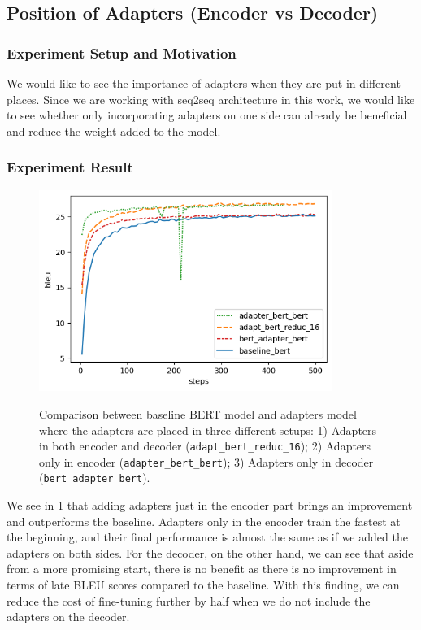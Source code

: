 \subsection{Position of Adapters (Encoder vs Decoder)}
\label{sec:posada}
\subsubsection{Experiment Setup and Motivation}
We would like to see the importance of adapters when they are put in different places. Since we are working with seq2seq architecture in this work, we would like to see whether only incorporating adapters on one side can already be beneficial and reduce the weight added to the model.

\subsubsection{Experiment Result}
\begin{figure}[]
    {\includegraphics[width=0.85\textwidth]{img/bert_pos.png}}
    \centering
    \caption[Results of ablation study for adapters in the encoder or the decoder.]{Comparison between baseline BERT model and adapters model where the adapters are placed in three different setups: 1) Adapters in both encoder and decoder (\texttt{adapt\_bert\_reduc\_16}); 2) Adapters only in encoder (\texttt{adapter\_bert\_bert}); 3) Adapters only in decoder (\texttt{bert\_adapter\_bert}).}
    \label{img:adapt_bert_pos}
\end{figure}
We see in \cref{img:adapt_bert_pos} that adding adapters just in the encoder part brings an improvement and outperforms the baseline. Adapters only in the encoder train the fastest at the beginning, and their final performance is almost the same as if we added the adapters on both sides. For the decoder, on the other hand, we can see that aside from a more promising start, there is no benefit as there is no improvement in terms of late BLEU scores compared to the baseline. With this finding, we can reduce the cost of fine-tuning further by half when we do not include the adapters on the decoder.


